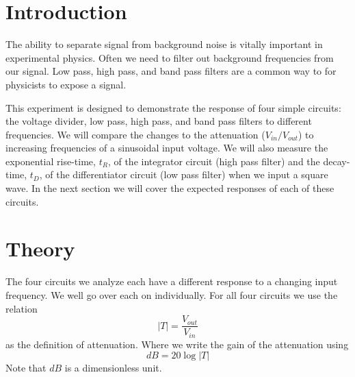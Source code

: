 \documentclass[11pt]{article}
\numberwithin{equation}{section}
\numberwithin{figure}{section}
\numberwithin{table}{section}
\begin{document}


\section{Introduction}
The ability to separate signal from background noise is vitally important in experimental physics. Often we need to filter out background frequencies from our signal. Low pass, high pass, and band pass filters are a common way to for physicists to expose a signal. 

This experiment is designed to demonstrate the response of four simple circuits: the voltage divider, low pass, high pass, and band pass filters to different frequencies. We will compare the changes to the attenuation ($V_{in}/V_{out}$) to increasing frequencies of a sinusoidal input voltage. We will also measure the exponential rise-time, $t_R$, of the integrator circuit (high pass filter) and the decay-time, $t_D$, of the differentiator circuit (low pass filter) when we input a square wave. In the next section we will cover the expected responses of each of these circuits.

\section{Theory}
The four circuits we analyze each have a different response to a changing input frequency. We well go over each on individually. For all four circuits we use the relation
\begin{equation}
|T| = \frac{V_{out}}{V_{in}}
\label{atten}
\end{equation}
as the definition of attenuation. Where we write the gain of the attenuation using
\begin{equation}
dB = 20\log|T|
\label{gain}
\end{equation}
Note that $dB$ is a dimensionless unit. 
\end{document}
